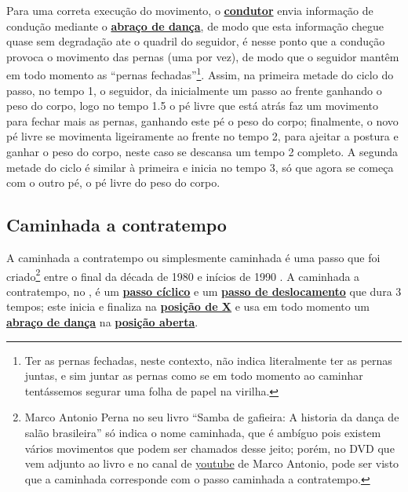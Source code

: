 Para uma correta execução do movimento, 
o \hyperref[def:Condutor]{\textbf{condutor}} envia informação de condução mediante o 
\hyperref[def:abracodedanca]{\textbf{abraço de dança}},
de modo que esta informação chegue quase sem degradação ate o quadril do seguidor,
é nesse ponto que a condução provoca o movimento das pernas (uma por vez), de modo que
o seguidor mantêm em todo momento as ``pernas fechadas''\footnote{
Ter as pernas fechadas, neste contexto, não indica literalmente ter as pernas juntas, 
e sim juntar as pernas como se em todo momento ao caminhar tentássemos segurar uma folha de papel na virilha.}.
Assim, na primeira metade do ciclo do passo, no tempo 1, o seguidor,
da inicialmente um passo ao frente ganhando o peso do corpo, 
logo no tempo 1.5 o pé livre que está atrás faz um movimento para fechar mais as pernas, 
ganhando este pé o peso do corpo; finalmente, o novo pé livre se movimenta ligeiramente ao frente no tempo 2, 
para ajeitar a postura e ganhar o peso do corpo, neste caso se descansa um tempo 2 completo.
A segunda metade do ciclo é similar à primeira e inicia no tempo 3, só que agora se começa com o outro pé, 
o pé livre do peso do corpo.



\subsection{Caminhada a contratempo}
A caminhada a contratempo ou simplesmente caminhada é
uma passo que foi  criado\footnote{Marco Antonio Perna no seu livro 
``Samba de gafieira: A historia da dança de salão brasileira''
só indica o nome caminhada, que é ambíguo pois existem vários 
movimentos que podem ser chamados desse jeito; porém, no
DVD que vem adjunto ao livro e no canal de 
\href{https://www.youtube.com/watch?v=Bke_poU6NBc}{youtube} de Marco Antonio,
pode ser visto que a caminhada corresponde com o passo caminhada a contratempo.} 
entre o final da década de 1980 e inícios de 1990  \cite[pp. 143]{perna2002samba}.
A caminhada a contratempo, no \AnoLivro, 
é um \hyperref[def:PassoCiclico]{\textbf{passo cíclico}} e 
um \hyperref[def:PassoDeDeslocamento]{\textbf{passo de deslocamento}} que dura 3 tempos;
este inicia e finaliza na \hyperref[def:X-position]{\textbf{posição de X}} e usa em todo momento 
um \hyperref[def:abracodedanca]{\textbf{abraço de dança}} na 
\hyperref[def:open-position]{\textbf{posição aberta}}.

